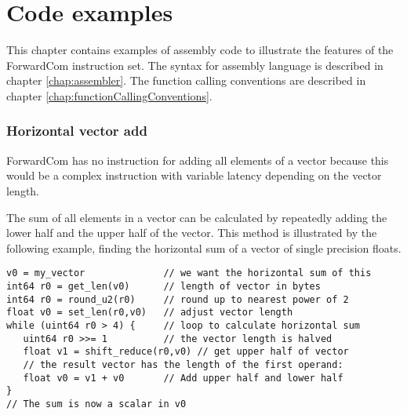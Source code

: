 \documentclass[forwardcom.tex]{subfiles}
\begin{document}
\RaggedRight
\lstset{language=C}            %
\lstset{basicstyle=\ttfamily,breaklines=true}

\chapter{Code examples}\label{chap:codeExamples}

This chapter contains examples of assembly code to illustrate the features of the ForwardCom instruction set.
The syntax for assembly language is described in chapter \ref{chap:assembler}.
The function calling conventions are described in chapter \ref{chap:functionCallingConventions}.
\vspace{2mm}


\subsection{Horizontal vector add} \label{horizontalVectorAdd}
ForwardCom has no instruction for adding all elements of a vector because this would be a complex instruction with variable latency depending on the vector length.
\vspace{2mm}

The sum of all elements in a vector can be calculated by repeatedly adding the lower half and the upper half of the vector. This method is illustrated by the following example, finding the horizontal sum of a vector of single precision floats. 

\begin{example}
\label{exampleHorizontalAdd}
\end{example} %
\begin{lstlisting}[frame=single]
v0 = my_vector              // we want the horizontal sum of this
int64 r0 = get_len(v0)      // length of vector in bytes
int64 r0 = round_u2(r0)     // round up to nearest power of 2
float v0 = set_len(r0,v0)   // adjust vector length
while (uint64 r0 > 4) {     // loop to calculate horizontal sum
   uint64 r0 >>= 1          // the vector length is halved
   float v1 = shift_reduce(r0,v0) // get upper half of vector
   // the result vector has the length of the first operand:
   float v0 = v1 + v0       // Add upper half and lower half
}
// The sum is now a scalar in v0
\end{lstlisting}
\vspace{4mm}
\end{document}
